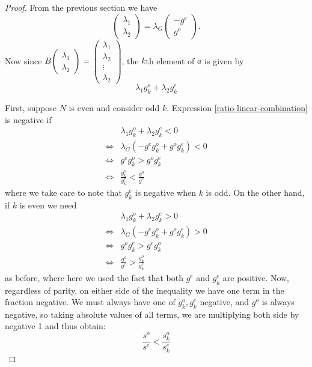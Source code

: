 \documentclass[11pt]{article}
\theoremstyle{definition}
\theoremstyle{remark}
\numberwithin{equation}{section}
\begin{document}
\begin{proof}
From the previous section we have 
\[\begin{pmatrix} \lambda_1 \\ \lambda_2 \end{pmatrix} = \lambda_G \begin{pmatrix} -g^e \\ g^o \end{pmatrix}.\]
Now since $B \begin{pmatrix} \lambda_1 \\ \lambda_2 \end{pmatrix} = \begin{pmatrix} \lambda_1 \\ \lambda_2 \\ \vdots \\ \lambda_2 \end{pmatrix}$, the $k$th element of $a$ is given by 
\begin{equation}\label{ratio-linear-combination} \lambda_1 g_k^o + \lambda_2 g_k^e \end{equation}

First, suppose $N$ is even and consider odd $k$. Expression \ref{ratio-linear-combination} is negative if \begin{align*}
&\lambda_1 g_k^o + \lambda_2 g_k^e < 0\\
\iff & \lambda_G(-g^e g_k^o + g^o g_k^e) < 0 \\
\iff & g^eg_k^o > g^og_k^e\\
\iff & \frac{g_k^o}{g_k^e} < \frac{g^o}{g^e}
\end{align*} where we take care to note that $g_k^e$ is negative when $k$ is odd. On the other hand, if $k$ is even we need
\begin{align*}
&\lambda_1 g_k^o + \lambda_2 g_k^e > 0\\
\iff & \lambda_G(-g^e g_k^o + g^o g_k^e) > 0 \\
\iff & g^og_k^e > g^eg_k^o\\
\iff & \frac{g^o}{g^e} > \frac{g^o_k}{g^e_k}
\end{align*} as before, where here we used the fact that both $g^e$ and $g^e_k$ are positive.  Now, regardless of parity, on either side of the inequality we have one term in the fraction negative. We must always have one of $g^o_k, g^e_k$ negative, and $g^o$ is always negative, so taking absolute values of all terms, we are multiplying both side by negative 1 and thus obtain: 
\[ \frac{s^o}{s^e} < \frac{s^o_k}{s^e_k}\]
\end{proof}
\end{document}
